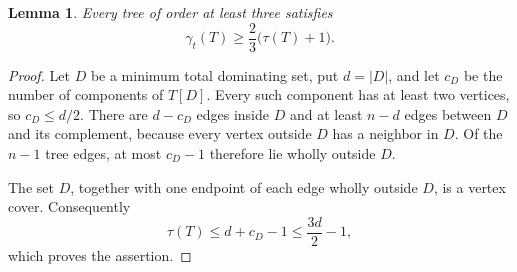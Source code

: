 \documentclass[11pt,a4paper]{article}
\newtheorem{lemma}[theorem]{Lemma}
\theoremstyle{remark}
\begin{document}
\begin{lemma}\label{newtree:cover-count}
Every tree of order at least three satisfies
\[
 \gamma_t(T)\geq\frac{2}{3}\bigl(\tau(T)+1\bigr).
\]
\end{lemma}
\begin{proof}
Let $D$ be a minimum total dominating set, put $d=|D|$, and let $c_D$ be
the number of components of $T[D]$.  Every such component has at least
two vertices, so $c_D\leq d/2$.  There are $d-c_D$ edges inside $D$ and
at least $n-d$ edges between $D$ and its complement, because every
vertex outside $D$ has a neighbor in $D$.  Of the $n-1$ tree edges, at
most $c_D-1$ therefore lie wholly outside $D$.

The set $D$, together with one endpoint of each edge wholly outside
$D$, is a vertex cover.  Consequently
\[
 \tau(T)\leq d+c_D-1\leq\frac{3d}{2}-1,
\]
which proves the assertion.
\end{proof}
\end{document}
